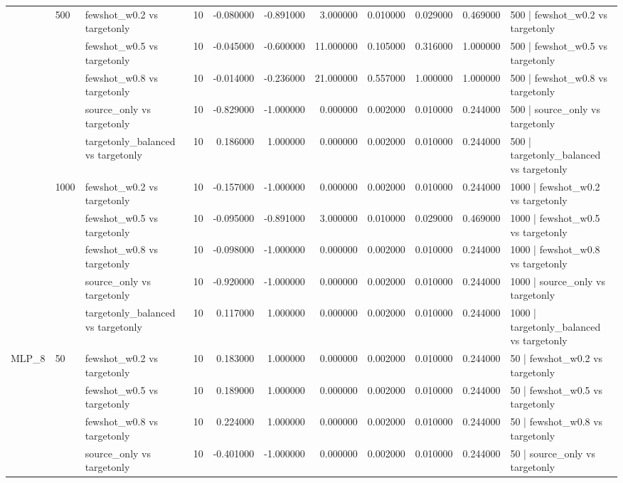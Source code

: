 \begin{tabular}{lllrrrrrrrl}
\cline{2-11}
 & \multirow[t]{5}{*}{500} & fewshot_w0.2 vs targetonly & 10 & -0.080000 & -0.891000 & 3.000000 & 0.010000 & 0.029000 & 0.469000 & 500 | fewshot_w0.2 vs targetonly \\
 &  & fewshot_w0.5 vs targetonly & 10 & -0.045000 & -0.600000 & 11.000000 & 0.105000 & 0.316000 & 1.000000 & 500 | fewshot_w0.5 vs targetonly \\
 &  & fewshot_w0.8 vs targetonly & 10 & -0.014000 & -0.236000 & 21.000000 & 0.557000 & 1.000000 & 1.000000 & 500 | fewshot_w0.8 vs targetonly \\
 &  & source_only vs targetonly & 10 & -0.829000 & -1.000000 & 0.000000 & 0.002000 & 0.010000 & 0.244000 & 500 | source_only vs targetonly \\
 &  & targetonly_balanced vs targetonly & 10 & 0.186000 & 1.000000 & 0.000000 & 0.002000 & 0.010000 & 0.244000 & 500 | targetonly_balanced vs targetonly \\
\cline{2-11}
 & \multirow[t]{5}{*}{1000} & fewshot_w0.2 vs targetonly & 10 & -0.157000 & -1.000000 & 0.000000 & 0.002000 & 0.010000 & 0.244000 & 1000 | fewshot_w0.2 vs targetonly \\
 &  & fewshot_w0.5 vs targetonly & 10 & -0.095000 & -0.891000 & 3.000000 & 0.010000 & 0.029000 & 0.469000 & 1000 | fewshot_w0.5 vs targetonly \\
 &  & fewshot_w0.8 vs targetonly & 10 & -0.098000 & -1.000000 & 0.000000 & 0.002000 & 0.010000 & 0.244000 & 1000 | fewshot_w0.8 vs targetonly \\
 &  & source_only vs targetonly & 10 & -0.920000 & -1.000000 & 0.000000 & 0.002000 & 0.010000 & 0.244000 & 1000 | source_only vs targetonly \\
 &  & targetonly_balanced vs targetonly & 10 & 0.117000 & 1.000000 & 0.000000 & 0.002000 & 0.010000 & 0.244000 & 1000 | targetonly_balanced vs targetonly \\
\cline{1-11} \cline{2-11}
\multirow[t]{25}{*}{MLP_8} & \multirow[t]{5}{*}{50} & fewshot_w0.2 vs targetonly & 10 & 0.183000 & 1.000000 & 0.000000 & 0.002000 & 0.010000 & 0.244000 & 50 | fewshot_w0.2 vs targetonly \\
 &  & fewshot_w0.5 vs targetonly & 10 & 0.189000 & 1.000000 & 0.000000 & 0.002000 & 0.010000 & 0.244000 & 50 | fewshot_w0.5 vs targetonly \\
 &  & fewshot_w0.8 vs targetonly & 10 & 0.224000 & 1.000000 & 0.000000 & 0.002000 & 0.010000 & 0.244000 & 50 | fewshot_w0.8 vs targetonly \\
 &  & source_only vs targetonly & 10 & -0.401000 & -1.000000 & 0.000000 & 0.002000 & 0.010000 & 0.244000 & 50 | source_only vs targetonly \\

\end{tabular}
